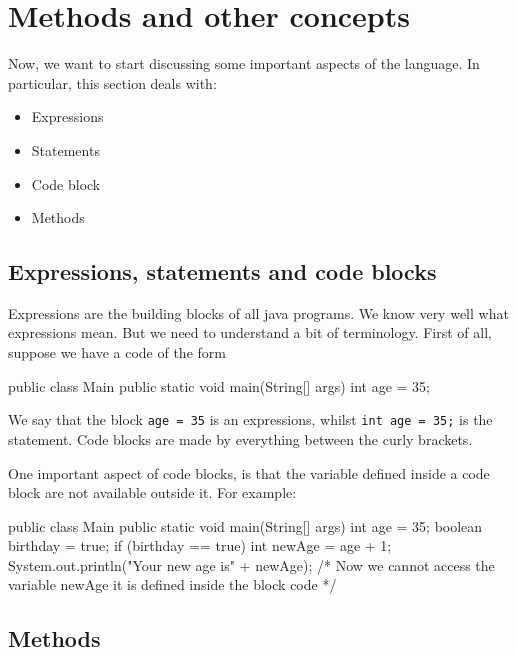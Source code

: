 \section{Methods and other concepts}

Now, we want to start discussing some important aspects of the language. In particular, this section 
deals with:
\begin{itemize}
    \item Expressions
    \item Statements
    \item Code block
    \item Methods
\end{itemize}

\subsection{Expressions, statements and code blocks}

Expressions are the building blocks of all java programs. We know very well what expressions mean.
But we need to understand a bit of terminology. First of all, suppose we have a code of the form   
\begin{listing}{1}
public class Main {    
    public static  void main(String[] args) {
        int age = 35;
    }
}
\end{listing}
We say that the block \verb|age = 35| is an expressions, whilst \verb|int age = 35;| is the 
statement. Code blocks are made by everything between the curly brackets. 

One important aspect of code blocks, is that the variable defined inside a code block are not 
available outside it. For example: 
\begin{listing}{1}
public class Main {    
    public static void main(String[] args) {
        int age = 35;
        boolean birthday = true;
        if (birthday == true) {
            int newAge = age + 1;
            System.out.println("Your new age is" + newAge);
        }
        /* Now we cannot access the variable newAge
           it is defined inside the block code */ 
    }
}
\end{listing}

\subsection{Methods}

